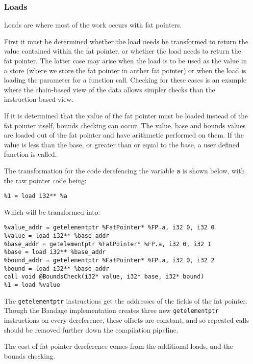 \subsubsection{Loads}

Loads are where most of the work occurs with fat pointers.

First it must be determined whether the load needs be transformed to return the value contained within the fat pointer, or whether the load needs to return the fat pointer.
The latter case may arise when the load is to be used as the value in a store (where we store the fat pointer in anther fat pointer) or when the load is loading the parameter for a function call.
Checking for these cases is an example where the chain-based view of the data allows simpler checks than the instruction-based view.

If it is determined that the value of the fat pointer must be loaded instead of the fat pointer itself, bounds checking can occur.
The value, base and bounds values are loaded out of the fat pointer and have arithmetic performed on them.
If the value is less than the base, or greater than or equal to the base, a user defined function is called.

The transformation for the code derefencing the variable \verb!a! is shown below, with the raw pointer code being:

\begin{verbatim}
%1 = load i32** %a
\end{verbatim}

Which will be transformed into:

\begin{verbatim}
%value_addr = getelementptr %FatPointer* %FP.a, i32 0, i32 0
%value = load i32** %base_addr
%base_addr = getelementptr %FatPointer* %FP.a, i32 0, i32 1
%base = load i32** %base_addr
%bound_addr = getelementptr %FatPointer* %FP.a, i32 0, i32 2
%bound = load i32** %base_addr
call void @BoundsCheck(i32* value, i32* base, i32* bound)
%1 = load %value
\end{verbatim}

The \verb!getelementptr! instructions get the addresses of the fields of the fat pointer.
Though the Bandage implementation creates three new \verb!getelementptr! instructions on every dereference, these offsets are constant, and so repeated calls should be removed further down the compilation pipeline.

The cost of fat pointer dereference comes from the additional loads, and the bounds checking.

